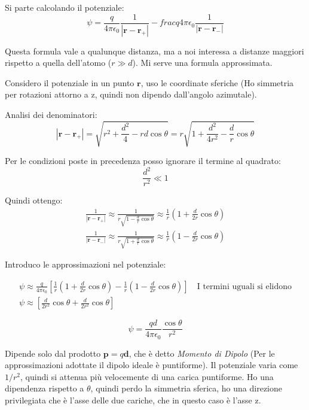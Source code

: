 \documentclass[a4paper]{scrarticle}
\begin{document}
Si parte calcolando il potenziale:
\begin{equation*}
    \psi = \frac{q}{4\pi\epsilon_0} \frac{1}{\left|\bm r - \bm r_+\right|} - frac{q}{4\pi\epsilon_0} \frac{1}{\left|\bm r - \bm r_-\right|}
\end{equation*}

Questa formula vale a qualunque distanza, ma a noi interessa a distanze maggiori rispetto a quella dell'atomo ($r \gg d$). Mi serve una formula approssimata.

Considero il potenziale in un punto $\bm r$, uso le coordinate sferiche (Ho simmetria per rotazioni attorno a z, quindi non dipendo dall'angolo azimutale).

Analisi dei denominatori:
\begin{equation*}
    \left|\bm r - \bm r_+\right|= \sqrt{r^2 + \frac{d^2}{4} - rd \cos \theta} = r \sqrt{1 + \frac{d^2}{4r^2} - \frac{d}{r}\cos \theta}
\end{equation*}

Per le condizioni poste in precedenza posso ignorare il termine al quadrato:
\begin{equation*}
    \frac{d^2}{r^2} \ll 1
\end{equation*}

Quindi ottengo:
\begin{gather}
    \frac{1}{\left|\bm r - \bm r_+\right|} \approx \frac{1}{r \sqrt{1 - \frac{d}{r}\cos \theta}} \approx \frac{1}{r}(1 + \frac{d}{2r}\cos \theta)\\
    \frac{1}{\left|\bm r - \bm r_-\right|} \approx \frac{1}{r \sqrt{1 + \frac{d}{r}\cos \theta}} \approx \frac{1}{r}(1 - \frac{d}{2r}\cos \theta)
\end{gather}

Introduco le approssimazioni nel potenziale:

\begin{gather*}
    \psi \approx \frac{q}{4\pi\epsilon_0}\left[\frac{1}{r}(1 + \frac{d}{2r}\cos \theta) - \frac{1}{r}(1 - \frac{d}{2r}\cos \theta)\right] \quad \text{I termini uguali si elidono}\\
    \psi \approx \left[\frac{d}{2r^2}\cos \theta + \frac{d}{2r^2}\cos \theta\right]
\end{gather*}

\begin{equation}
    \psi = \frac{qd}{4\pi\epsilon_0}\frac{\cos\theta}{r^2}
\end{equation}

Dipende solo dal prodotto $\bm p = q \bm d$, che è detto \emph{Momento di Dipolo} (Per le approssimazioni adottate il dipolo ideale è puntiforme).
Il potenziale varia come $1/r^2$, quindi si attenua più velocemente di una carica puntiforme.
Ho una dipendenza rispetto a $\theta$, quindi perdo la simmetria sferica, ho una direzione privilegiata che è l'asse delle due cariche, che in questo caso è l'asse z.
\end{document}
